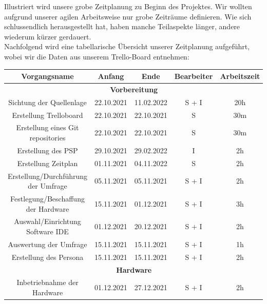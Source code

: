 Illustriert wird unsere grobe Zeitplanung zu Beginn des Projektes. Wir wollten aufgrund unserer agilen Arbeitsweise nur grobe Zeiträume definieren. Wie sich schlussendlich herausgestellt hat, haben manche Teilaspekte länger, andere wiederum kürzer gerdauert.\\



\newpage
Nachfolgend wird eine tabellarische Übersicht unserer Zeitplanung aufgeführt, wobei wir die Daten aus unserem Trello-Board entnehmen:\\

\begin{adjustwidth}{-1in}{-1in}%
	\begin{center}
		\begin{tabular}{ ccccc }
			\toprule
			{Vorgangsname} & {Anfang} & {Ende} & {Bearbeiter} & {Arbeitszeit}\\

			\midrule
			\multicolumn{5}{c}{\textbf{Vorbereitung}} \\
			{Sichtung der Quellenlage} & {22.10.2021} & {11.02.2022} & S + I & 20h\\
			{Erstellung Trelloboard} & {22.10.2021} & {22.10.2021} & S & 30m\\
			{Erstellung eines Git repositories} & {22.10.2021} & {22.10.2021} & S & 30m\\
			{Erstellung des PSP} & {29.10.2021} & {29.02.2022} & I & 2h\\
			{Erstellung Zeitplan} & {01.11.2021} & {04.11.2022} & S & 2h\\
			{Erstellung/Durchführung der Umfrage} & {05.11.2021} & {05.11.2021} & S + I & 2h\\
			{Festlegung/Beschaffung der Hardware} & {15.11.2021} & {01.12.2021} & S + I & 3h\\
			{Auswahl/Einrichtung Software IDE} & {01.12.2021} & {20.12.2021} & S + I & 2h\\
			{Auswertung der Umfrage} & {15.11.2021} & {15.11.2021} & S + I & 1h\\
			{Erstellung des Persona} & {15.11.2021} & {15.11.2021} & S + I & 2h\\

			\midrule
			\multicolumn{5}{c}{\textbf{Hardware}} \\
			{Inbetriebnahme der Hardware} & {01.12.2021} & {27.12.2021} & S + I & 2h\\


\end{tabular}
\end{center}
\end{adjustwidth}
